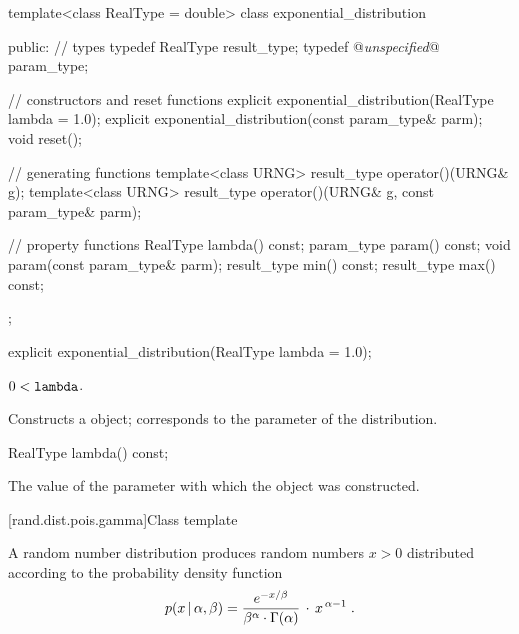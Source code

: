 \begin{codeblock}
template<class RealType = double>
 class exponential_distribution
{
public:
 // types
 typedef RealType result_type;
 typedef @\textit{unspecified}@ param_type;

 // constructors and reset functions
 explicit exponential_distribution(RealType lambda = 1.0);
 explicit exponential_distribution(const param_type& parm);
 void reset();

 // generating functions
 template<class URNG>
   result_type operator()(URNG& g);
 template<class URNG>
   result_type operator()(URNG& g, const param_type& parm);

 // property functions
 RealType lambda() const;
 param_type param() const;
 void param(const param_type& parm);
 result_type min() const;
 result_type max() const;
};
\end{codeblock}


%
\begin{itemdecl}
explicit exponential_distribution(RealType lambda = 1.0);
\end{itemdecl}

\begin{itemdescr}
\pnum\requires
 $ 0 < \texttt{lambda} $.

\pnum\effects Constructs a  object;
 corresponds to the parameter of the distribution.
\end{itemdescr}

%
%
\begin{itemdecl}
RealType lambda() const;
\end{itemdecl}

\begin{itemdescr}
\pnum\returns The value of the  parameter
 with which the object was constructed.
\end{itemdescr}


[rand.dist.pois.gamma]{Class template }%
%

\pnum
A  random number distribution
produces random numbers $x > 0$
distributed according to
the probability density function%
%
\[%
 p(x\,|\,\alpha,\beta)
      = {     e^{-x/\beta}
        \over {\beta^{\alpha} \cdot \Gamma(\alpha)}
        }
        \, \cdot \, x^{\, \alpha-1}
\; \mbox{.}
\]

